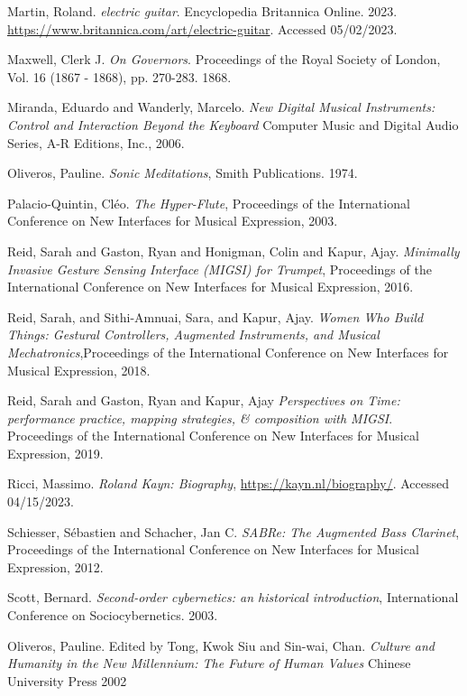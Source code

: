 \begin{thebibliography}{99}
 Martin, Roland. \emph{electric guitar}. Encyclopedia Britannica Online. 2023. \url{https://www.britannica.com/art/electric-guitar}. Accessed 05/02/2023.

 Maxwell, Clerk J. \emph{On Governors}. Proceedings of the Royal Society of London, Vol. 16 (1867 - 1868), pp. 270-283. 1868.

 Miranda, Eduardo and Wanderly, Marcelo. \emph{New Digital Musical Instruments: Control and Interaction Beyond the Keyboard} Computer Music and Digital Audio Series, A-R Editions, Inc., 2006.

 Oliveros, Pauline. \emph{Sonic Meditations}, Smith Publications. 1974.

 Palacio-Quintin, Cléo. \emph{The Hyper-Flute}, Proceedings of the International Conference on New Interfaces for Musical Expression, 2003.

 Reid, Sarah and Gaston, Ryan and Honigman, Colin and Kapur, Ajay. \emph{Minimally Invasive Gesture Sensing Interface (MIGSI) for Trumpet}, Proceedings of the International Conference on New Interfaces for Musical Expression, 2016.

 Reid, Sarah, and Sithi-Amnuai, Sara, and Kapur, Ajay. \emph{Women Who Build Things: Gestural Controllers, Augmented Instruments, and Musical Mechatronics},Proceedings of the International Conference on New Interfaces for Musical Expression, 2018.

 Reid, Sarah and Gaston, Ryan and Kapur, Ajay \emph{Perspectives on Time: performance practice, mapping strategies, \& composition with MIGSI}. Proceedings of the International Conference on New Interfaces for Musical Expression, 2019.

 Ricci, Massimo. \emph{Roland Kayn: Biography}, \url{https://kayn.nl/biography/}. Accessed 04/15/2023.

 Schiesser, S{\'e}bastien and Schacher, Jan C. \emph{SABRe: The Augmented Bass Clarinet}, Proceedings of the International Conference on New Interfaces for Musical Expression, 2012.

 Scott, Bernard. \emph{Second-order cybernetics: an historical introduction}, International Conference on Sociocybernetics. 2003.

 Oliveros, Pauline. Edited by Tong, Kwok Siu and Sin-wai, Chan. \emph{Culture and Humanity in the New Millennium: The Future of Human Values} Chinese University Press 2002


\end{thebibliography}
